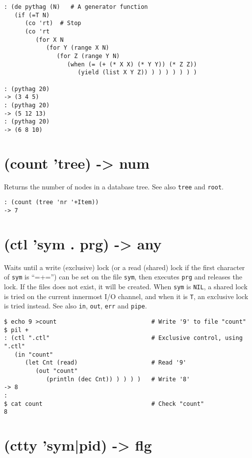 {\begin{verbatim}
: (de pythag (N)   # A generator function
   (if (=T N)
      (co 'rt)  # Stop
      (co 'rt
         (for X N
            (for Y (range X N)
               (for Z (range Y N)
                  (when (= (+ (* X X) (* Y Y)) (* Z Z))
                     (yield (list X Y Z)) ) ) ) ) ) ) )

: (pythag 20)
-> (3 4 5)
: (pythag 20)
-> (5 12 13)
: (pythag 20)
-> (6 8 10)
\end{verbatim}

 
\section{(count 'tree) -> num}
\label{sec-8-1-3-36}


Returns the number of nodes in a database tree. See also \texttt{tree} and
\texttt{root}.


\begin{verbatim}
: (count (tree 'nr '+Item))
-> 7
\end{verbatim}

 
\section{(ctl 'sym . prg) -> any}
\label{sec-8-1-3-37}


Waits until a write (exclusive) lock (or a read (shared) lock if the
first character of \texttt{sym} is ``=+='') can be set on the file \texttt{sym}, then
executes \texttt{prg} and releases the lock. If the files does not exist, it
will be created. When \texttt{sym} is \texttt{NIL}, a shared lock is tried on the
current innermost I/O channel, and when it is \texttt{T}, an exclusive lock is
tried instead. See also \texttt{in}, \texttt{out}, \texttt{err} and \texttt{pipe}.


\begin{verbatim}
$ echo 9 >count                           # Write '9' to file "count"
$ pil +
: (ctl ".ctl"                             # Exclusive control, using ".ctl"
   (in "count"
      (let Cnt (read)                     # Read '9'
         (out "count"
            (println (dec Cnt)) ) ) ) )   # Write '8'
-> 8
:
$ cat count                               # Check "count"
8
\end{verbatim}

 
\section{(ctty 'sym|pid) -> flg}
\label{sec-8-1-3-38}


}
